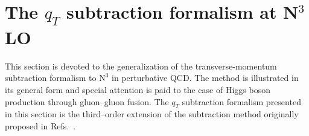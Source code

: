 \documentclass[12pt]{article}
\DeclareRobustCommand{\qt}{\ensuremath{q_T}\xspace}
\DeclareRobustCommand{\LO}{\text{LO}\xspace}
\DeclareRobustCommand{\N}[1]{\ensuremath{\text{N}^{#1}}} %
\begin{document}
\section{The \texorpdfstring{$\qt$}{qT} subtraction formalism at \texorpdfstring{N${}^\text{3}$LO}{N3LO}}
\label{sec:forma}
This section is devoted to the generalization of the transverse-momentum subtraction formalism to \N3\LO in perturbative QCD. The method is illustrated in its general form and special attention is paid to the case of Higgs boson production through gluon--gluon fusion. The $\qt$ subtraction formalism presented in this section is the third--order extension of the subtraction method originally proposed in Refs.~\cite{Catani:2007vq,Bozzi:2005wk,Bonciani:2015sha}.
\end{document}
